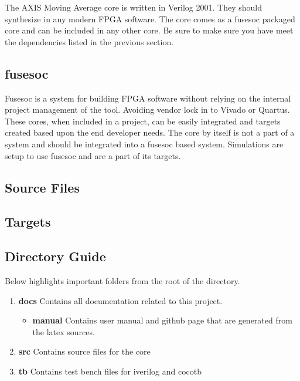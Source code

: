 \par
The AXIS Moving Average core is written in Verilog 2001. They should synthesize in any modern FPGA software. The core comes as a fusesoc packaged core and can be
included in any other core. Be sure to make sure you have meet the dependencies listed in the previous section.

\subsection{fusesoc}
\par
Fusesoc is a system for building FPGA software without relying on the internal project management of the tool. Avoiding vendor lock in to Vivado or Quartus.
These cores, when included in a project, can be easily integrated and targets created based upon the end developer needs. The core by itself is not a part of
a system and should be integrated into a fusesoc based system. Simulations are setup to use fusesoc and are a part of its targets.

\subsection{Source Files}



\subsection{Targets}



\subsection{Directory Guide}

\par
Below highlights important folders from the root of the directory.

\begin{enumerate}
  \item \textbf{docs} Contains all documentation related to this project.
    \begin{itemize}
      \item \textbf{manual} Contains user manual and github page that are generated from the latex sources.
    \end{itemize}
  \item \textbf{src} Contains source files for the core
  \item \textbf{tb} Contains test bench files for iverilog and cocotb
\end{enumerate}

